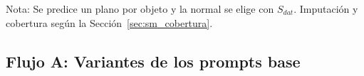 \begin{table}[H]
\vspace{1.5ex}
\begin{minipage}{\textwidth}
Nota: Se predice un plano por objeto y la normal se elige con $S_{dat}$. Imputación y cobertura según la Sección~\ref{sec:sm_cobertura}.
\end{minipage}
\end{table}






\newpage
\clearpage
\subsection{Flujo A: Variantes de los prompts base}

\begin{table}[H]
\centering
\caption{Métricas de las variantes \texttt{\_1} del Flujo A en simetría planar, resolución 224px, iluminación \textit{flat}, envío multiimagen.}
\label{tab:nov_plane_variantes_1}
\footnotesize
\setlength{\tabcolsep}{3pt}
\renewcommand{\arraystretch}{0.95}


\end{table}
